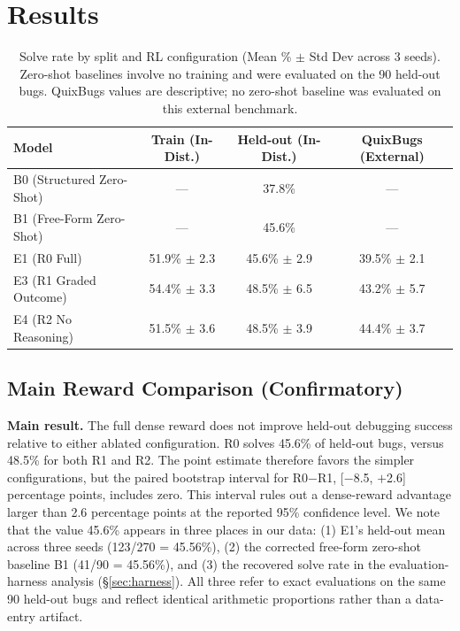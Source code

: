 \documentclass{article}
\begin{document}
\section{Results}

\begin{table}[h]
\centering
\small
\begin{tabular}{l c c c}
\toprule
\textbf{Model} & \textbf{Train (In-Dist.)} & \textbf{Held-out (In-Dist.)} & \textbf{QuixBugs (External)} \\
\midrule
B0 (Structured Zero-Shot) & --- & 37.8\% & --- \\
B1 (Free-Form Zero-Shot)   & --- & 45.6\% & --- \\
E1 (R0 Full)              & 51.9\% $\pm$ 2.3 & 45.6\% $\pm$ 2.9 & 39.5\% $\pm$ 2.1 \\
E3 (R1 Graded Outcome)     & 54.4\% $\pm$ 3.3 & 48.5\% $\pm$ 6.5 & 43.2\% $\pm$ 5.7 \\
E4 (R2 No Reasoning)      & 51.5\% $\pm$ 3.6 & 48.5\% $\pm$ 3.9 & 44.4\% $\pm$ 3.7 \\
\bottomrule
\end{tabular}
\caption{Solve rate by split and RL configuration (Mean \% $\pm$ Std Dev across 3 seeds). Zero-shot baselines involve no training and were evaluated on the 90 held-out bugs. QuixBugs values are descriptive; no zero-shot baseline was evaluated on this external benchmark.}
\label{tab:results}
\end{table}

\subsection{Main Reward Comparison (Confirmatory)}
\textbf{Main result.} The full dense reward does not improve held-out debugging success relative to either ablated configuration. R0 solves 45.6\% of held-out bugs, versus 48.5\% for both R1 and R2. The point estimate therefore favors the simpler configurations, but the paired bootstrap interval for R0$-$R1, [$-$8.5, $+$2.6] percentage points, includes zero. This interval rules out a dense-reward advantage larger than 2.6 percentage points at the reported 95\% confidence level. We note that the value 45.6\% appears in three places in our data: (1) E1's held-out mean across three seeds (123/270 = 45.56\%), (2) the corrected free-form zero-shot baseline B1 (41/90 = 45.56\%), and (3) the recovered solve rate in the evaluation-harness analysis (§\ref{sec:harness}). All three refer to exact evaluations on the same 90 held-out bugs and reflect identical arithmetic proportions rather than a data-entry artifact.
\end{document}
